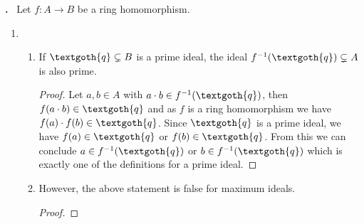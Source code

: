 \documentclass[11pt]{scrartcl}
\newcounter{problem}
\newcounter{solution}
\newcommand\Problem{%
  \stepcounter{problem}%
  \textbf{\theproblem.}~%
  \setcounter{solution}{0}%
}
\begin{document}
\newpage

\Problem Let \(f: A \rightarrow B\) be a ring homomorphism.
\begin{enumerate}
    \item
    \begin{enumerate}
        \item If \(\textgoth{q} \subsetneq B\) is a prime ideal, the ideal \(f^{-1}(\textgoth{q}) \subsetneq A\) is also prime.
        \begin{proof}
            Let \(a, b \in A\) with \(a \cdot b \in f^{-1}(\textgoth{q})\), then \(f(a \cdot b) \in \textgoth{q}\) and as \(f\) is a ring homomorphism we have \(f(a) \cdot f(b) \in \textgoth{q}\). Since \(\textgoth{q}\) is a prime ideal, we have \(f(a) \in \textgoth{q}\) or \(f(b) \in \textgoth{q}\). From this we can conclude \(a \in f^{-1}(\textgoth{q})\) or \(b \in f^{-1}(\textgoth{q})\) which is exactly one of the definitions for a prime ideal.
        \end{proof}
        \item However, the above statement is false for maximum ideals.
        \begin{proof}
        \end{proof}
    \end{enumerate}
\end{enumerate}
%
\end{document}
